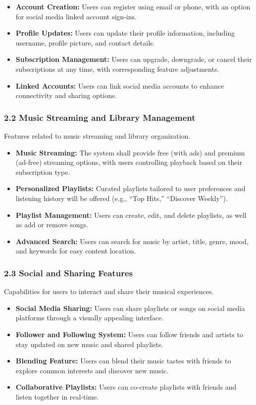 \documentclass[a4paper,10pt]{article}
\begin{document}
\begin{itemize}[leftmargin=*]
    \item \textbf{Account Creation:} Users can register using email or phone, with an option for social media linked account sign-ins.
    \item \textbf{Profile Updates:} Users can update their profile information, including username, profile picture, and contact details.
    \item \textbf{Subscription Management:} Users can upgrade, downgrade, or cancel their subscriptions at any time, with corresponding feature adjustments.
    \item \textbf{Linked Accounts:} Users can link social media accounts to enhance connectivity and sharing options.
\end{itemize}

\subsubsection*{2.2 Music Streaming and Library Management}
Features related to music streaming and library organization.

\begin{itemize}[leftmargin=*]
    \item \textbf{Music Streaming:} The system shall provide free (with ads) and premium (ad-free) streaming options, with users controlling playback based on their subscription type.
    \item \textbf{Personalized Playlists:} Curated playlists tailored to user preferences and listening history will be offered (e.g., “Top Hits,” “Discover Weekly”).
    \item \textbf{Playlist Management:} Users can create, edit, and delete playlists, as well as add or remove songs.
    \item \textbf{Advanced Search:} Users can search for music by artist, title, genre, mood, and keywords for easy content location.
\end{itemize}

\subsubsection*{2.3 Social and Sharing Features}
Capabilities for users to interact and share their musical experiences.

\begin{itemize}[leftmargin=*]
    \item \textbf{Social Media Sharing:} Users can share playlists or songs on social media platforms through a visually appealing interface.
    \item \textbf{Follower and Following System:} Users can follow friends and artists to stay updated on new music and shared playlists.
    \item \textbf{Blending Feature:} Users can blend their music tastes with friends to explore common interests and discover new music.
    \item \textbf{Collaborative Playlists:} Users can co-create playlists with friends and listen together in real-time.
\end{itemize}
\end{document}
